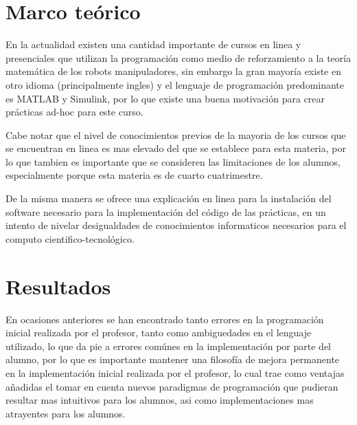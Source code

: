 
\section{Marco teórico}

	En la actualidad existen una cantidad importante de cursos en linea\cite{google:Robotics} y presenciales que utilizan la programación como medio de reforzamiento a la teoría matemática de los robots manipuladores, sin embargo la gran mayoría existe en otro idioma (principalmente ingles) y el lenguaje de programación predominante es MATLAB y Simulink\cite{MATLAB:2015}, por lo que existe una buena motivación para crear prácticas ad-hoc para este curso.

	Cabe notar que el nivel de conocimientos previos de la mayoria de los cursos que se encuentran en linea es mas elevado del que se establece para esta materia, por lo que tambien es importante que se consideren las limitaciones de los alumnos, especialmente porque esta materia es de cuarto cuatrimestre.

	De la misma manera se ofrece una explicación en linea\cite{github:instalacion} para la instalación del software necesario para la implementación del código de las prácticas, en un intento de nivelar desigualdades de conocimientos informaticos necesarios para el computo cientifico-tecnológico.


\section{Resultados}

	En ocasiones anteriores se han encontrado tanto errores en la programación inicial realizada por el profesor, tanto como ambiguedades en el lenguaje utilizado, lo que da pie a errores comúnes en la implementación por parte del alumno, por lo que es importante mantener una filosofía de mejora permanente en la implementación inicial realizada por el profesor, lo cual trae como ventajas añadidas el tomar en cuenta nuevos paradigmas de programación que pudieran resultar mas intuitivos para los alumnos, asi como implementaciones mas atrayentes para los alumnos.


{}





